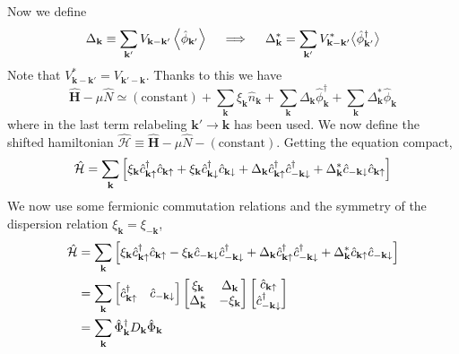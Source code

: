Now we define
\[
	\Delta_\mathbf{k} \equiv \sum_{\mathbf{k}'} V_{\mathbf{k}-\mathbf{k}'} \ev{\hat{\phi}_{\mathbf{k}'}}
	\quad\implies\quad
	\Delta_\mathbf{k}^* = \sum_{\mathbf{k}'} V_{\mathbf{k}-\mathbf{k}'}^* \big\langle\hat{\phi}_{\mathbf{k}'}^\dagger\big\rangle
\]
Note that $V_{\mathbf{k}-\mathbf{k}'}^* = V_{\mathbf{k}'-\mathbf{k}}$. Thanks to this we have
\[
	\hat{\bm H} - \mu\hat{N} \simeq (\mathrm{constant}) + \sum_{\mathbf{k}} \xi_{\mathbf{k}} \hat n_\mathbf{k} + 
	\sum_\mathbf{k} \Delta_\mathbf{k} \hat{\phi}_\mathbf{k}^\dagger + \sum_\mathbf{k} \Delta_\mathbf{k}^* \hat{\phi}_\mathbf{k}
\]
where in the last term relabeling $\mathbf{k}' \to \mathbf{k}$ has been used. We now define the shifted hamiltonian $\hat{\mathcal{H}} \equiv \hat{\bm H} - \mu\hat{N} - (\mathrm{constant})$. Getting the equation compact,
\[
	\hat{\mathcal{H}} = \sum_\mathbf{k} \left[{\xi_\mathbf{k} \hat{c}_{\mathbf{k}\uparrow}^\dagger \hat{c}_{\mathbf{k}\uparrow} + \xi_\mathbf{k} \hat{c}_{\mathbf{k}\downarrow}^\dagger \hat{c}_{\mathbf{k}\downarrow} + \Delta_\mathbf{k} \hat{c}_{\mathbf{k}\uparrow}^\dagger \hat{c}_{-\mathbf{k}\downarrow}^\dagger + \Delta_\mathbf{k}^*	 \hat{c}_{-\mathbf{k}\downarrow} \hat{c}_{\mathbf{k}\uparrow} }\right]
\]
We now use some fermionic commutation relations and the symmetry of the dispersion relation $\xi_\mathbf{k} = \xi_{-\mathbf{k}}$,
\[
\begin{aligned}
	\hat{\mathcal{H}} &= \sum_\mathbf{k} \left[{\xi_\mathbf{k} \hat{c}_{\mathbf{k}\uparrow}^\dagger \hat{c}_{\mathbf{k}\uparrow} - \xi_\mathbf{k}
	\hat{c}_{-\mathbf{k}\downarrow} \hat{c}_{-\mathbf{k}\downarrow}^\dagger + \Delta_\mathbf{k} \hat{c}_{\mathbf{k}\uparrow}^\dagger \hat{c}_{-\mathbf{k}\downarrow}^\dagger + \Delta_\mathbf{k}^* \hat{c}_{\mathbf{k}\uparrow} \hat{c}_{-\mathbf{k}\downarrow} }\right] \\
	&= \sum_\mathbf{k} \begin{bmatrix}
		\hat{c}_{\mathbf{k}\uparrow}^\dagger & \hat{c}_{-\mathbf{k}\downarrow}
	\end{bmatrix} \begin{bmatrix}
		\xi_\mathbf{k} & \Delta_\mathbf{k} \\
		\Delta_\mathbf{k}^* & - \xi_\mathbf{k}
	\end{bmatrix} \begin{bmatrix}
		\hat{c}_{\mathbf{k}\uparrow} \\
		\hat{c}_{-\mathbf{k}\downarrow}^\dagger
	\end{bmatrix} \\
	&= \sum_\mathbf{k} \hat{\Phi}_\mathbf{k}^\dagger D_\mathbf{k} \hat{\Phi}_\mathbf{k}
\end{aligned}
\]
